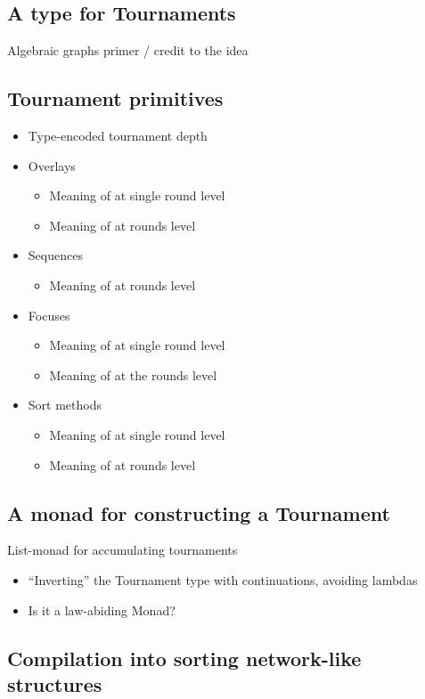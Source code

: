 \documentclass[a4,11pt,twoside,final]{article}
\begin{document}
\subsection{A type for Tournaments}
\label{sec:org1de4929}
Algebraic graphs primer / credit to the idea

\subsection{Tournament primitives}
\label{sec:orgfd87dda}
\begin{itemize}
\item Type-encoded tournament depth
\item Overlays
\begin{itemize}
\item Meaning of at single round level
\item Meaning of at rounds level
\end{itemize}
\item Sequences
\begin{itemize}
\item Meaning of at rounds level
\end{itemize}
\item Focuses
\begin{itemize}
\item Meaning of at single round level
\item Meaning of at the rounds level
\end{itemize}
\item Sort methods
\begin{itemize}
\item Meaning of at single round level
\item Meaning of at rounds level
\end{itemize}
\end{itemize}

\subsection{A monad for constructing a Tournament}
\label{sec:orgac2bafe}
List-monad for accumulating tournaments
\begin{itemize}
\item ``Inverting'' the Tournament type with continuations, avoiding lambdas
\item Is it a law-abiding Monad?
\end{itemize}

\subsection{Compilation into sorting network-like structures}
\label{sec:orga712128}
\end{document}
